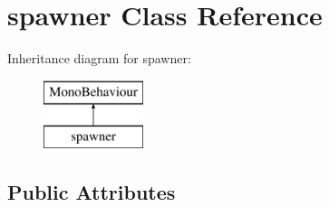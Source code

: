 \hypertarget{classspawner}{}\section{spawner Class Reference}
\label{classspawner}
Inheritance diagram for spawner\+:\begin{figure}[H]
\begin{center}
\leavevmode
\includegraphics[height=2.000000cm]{classspawner}
\end{center}
\end{figure}
\subsection*{Public Attributes}
